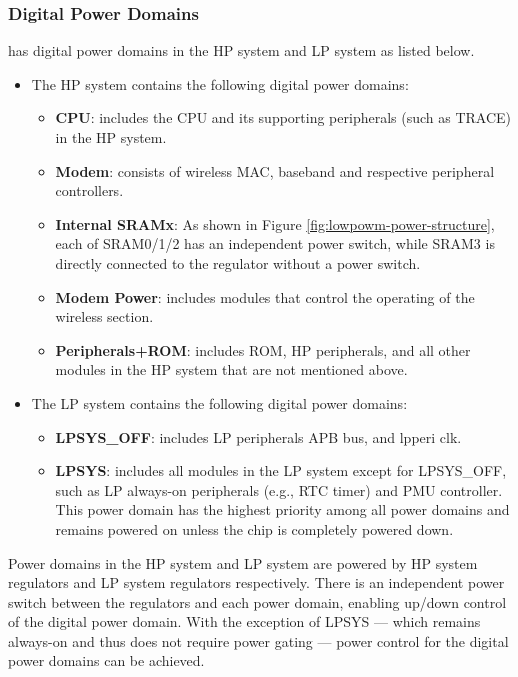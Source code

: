 \documentclass[main\_\_EN.tex]{subfiles}
\begin{document}
\subsubsection{Digital Power Domains}\label{sec:lowpowm_digital_domain}

\chipname{} has digital power domains in the HP system and LP system as listed below.

\begin{itemize}
    \item The HP system contains the following digital power domains:
    \begin{itemize}
        \item \textbf{CPU}: includes the CPU and its supporting peripherals (such as TRACE) in the HP system.
        \item \textbf{Modem}: consists of wireless MAC, baseband and respective peripheral controllers.
        \item \textbf{Internal SRAMx}: As shown in Figure \ref{fig:lowpowm-power-structure}, each of SRAM0/1/2 has an independent power switch, while SRAM3 is directly connected to the regulator without a power switch.
        \item \textbf{Modem Power}: includes modules that control the operating of the wireless section.
        \item \textbf{Peripherals+ROM}: includes ROM, HP peripherals, and all other modules in the HP system that are not mentioned above.
    \end{itemize}
    \item The LP system contains the following digital power domains:
    \begin{itemize}
        \item \textbf{LPSYS\_OFF}: includes LP peripherals APB bus, and lpperi clk.
        \item \textbf{LPSYS}: includes all modules in the LP system except for LPSYS\_OFF, such as LP always-on peripherals (e.g., RTC timer) and PMU controller. This power domain has the highest priority among all power domains and remains powered on unless the chip is completely powered down.
    \end{itemize}
\end{itemize}

Power domains in the HP system and LP system are powered by HP system regulators and LP system regulators respectively. There is an independent power switch between the regulators and each power domain, enabling up/down control of the digital power domain. With the exception of LPSYS — which remains always-on and thus does not require power gating — power control for the digital power domains can be achieved.
\end{document}
